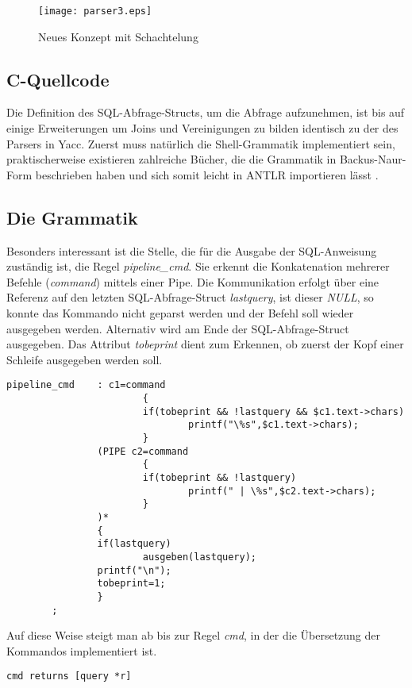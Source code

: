 \begin{figure}[h]
\centering
\texttt{[image: parser3.eps]}
\caption{Neues Konzept mit Schachtelung}
\label{fig:parser3}
\end{figure}

\subsection{C-Quellcode}
Die Definition des SQL-Abfrage-Structs, um die Abfrage aufzunehmen, ist bis auf einige Erweiterungen um Joins und Vereinigungen zu bilden identisch zu der des Parsers in Yacc.
Zuerst muss natürlich die Shell-Grammatik implementiert sein, praktischerweise existieren zahlreiche Bücher, die die Grammatik in Backus-Naur-Form beschrieben haben und sich somit leicht in ANTLR importieren lässt \cite{Shell-BNF}.

\subsection{Die Grammatik}
Besonders interessant ist die Stelle, die für die Ausgabe der SQL-Anweisung zuständig ist, die Regel \textit{pipeline\_cmd}. Sie erkennt die Konkatenation mehrerer Befehle (\textit{command}) mittels einer Pipe. Die Kommunikation erfolgt über eine Referenz auf den letzten SQL-Abfrage-Struct \textit{lastquery}, ist dieser \textit{NULL}, so konnte das Kommando nicht geparst werden und der Befehl soll wieder ausgegeben werden. Alternativ wird am Ende der SQL-Abfrage-Struct ausgegeben. Das Attribut \textit{tobeprint} dient zum Erkennen, ob zuerst der Kopf einer Schleife ausgegeben werden soll.

\begin{lstlisting}
pipeline_cmd    : c1=command
                        {
                        if(tobeprint && !lastquery && $c1.text->chars)
                                printf("\%s",$c1.text->chars);
                        }
                (PIPE c2=command
                        {
                        if(tobeprint && !lastquery)
                                printf(" | \%s",$c2.text->chars);
                        }
                )*
                {
                if(lastquery)
                        ausgeben(lastquery);
                printf("\n");
                tobeprint=1;
                }
        ;
\end{lstlisting}

Auf diese Weise steigt man ab bis zur Regel \textit{cmd}, in der die Übersetzung der Kommandos implementiert ist.
\begin{lstlisting}
cmd returns [query *r]
\end{lstlisting}

